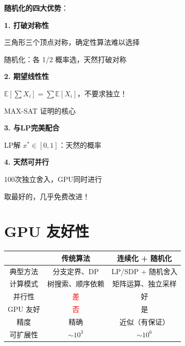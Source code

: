 \documentclass[12pt, a4paper]{ctexart}
\begin{document}
\begin{blackboard}[随机化与并行的天然契合]

\textbf{随机化的四大优势}：

\textbf{1. 打破对称性}

三角形三个顶点对称，确定性算法难以选择

随机化：各 1/2 概率选，天然打破对称

\textbf{2. 期望线性性}

$\mathbb{E}[\sum X_i] = \sum \mathbb{E}[X_i]$，不要求独立！

MAX-SAT 证明的核心

\textbf{3. 与LP完美配合}

LP解 $x^* \in [0,1]$：天然的概率

\textbf{4. 天然可并行}

100次独立舍入，GPU同时进行

取最好的，几乎免费改进！

\end{blackboard}

\section{GPU 友好性}

\begin{blackboard}[传统 vs 现代方法]

\begin{center}
\begin{tabular}{c|c|c}
& \textbf{传统算法} & \textbf{连续化 + 随机化} \\
\hline
典型方法 & 分支定界、DP & LP/SDP + 随机舍入 \\
\hline
计算模式 & 树搜索、顺序依赖 & 矩阵运算、独立采样 \\
\hline
并行性 & \textcolor{red}{差} & \textcolor{green!50!black}{好} \\
\hline
GPU 友好 & \textcolor{red}{否} & \textcolor{green!50!black}{是} \\
\hline
精度 & 精确 & 近似（有保证） \\
\hline
可扩展性 & $\sim 10^3$ & $\sim 10^6$
\end{tabular}
\end{center}

\end{blackboard}
\end{document}
